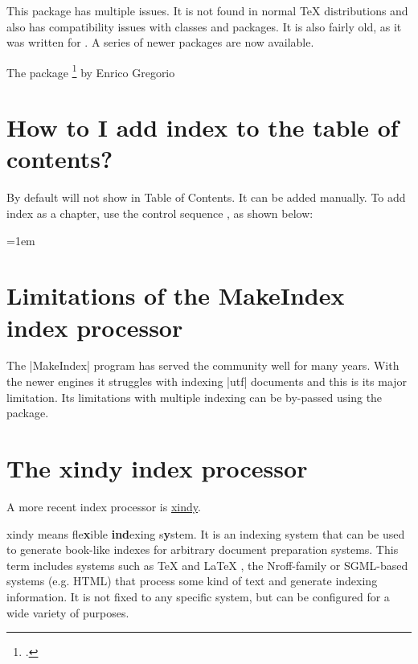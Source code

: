 This package has multiple issues. It is not found in normal TeX distributions and also has compatibility issues with \AmS classes and packages. It is also fairly old, as it was written for . A series of newer packages are now available.

The package \footcite{imakeidx} by Enrico Gregorio 

\section{How to I add index to the table of contents?}
By default \latexe will not show in Table of Contents. It can be added manually. To add index as a chapter, use the control sequence , as shown below:

\begin{teX}
\clearpage
{}
\printindex
\end{teX}

\begin{teX}
\clearpage
{}
\printindex
\end{teX}

\parindent=1em
\section{Limitations of the MakeIndex index processor}

The |MakeIndex| program has served the \latex community well for many years. With the newer engines it struggles
with indexing |utf| documents and this is its major limitation. Its limitations with multiple indexing can be by-passed
using the  package.

\section{The xindy index processor}

A more recent index processor is \href{http://www.xindy.org}{xindy}. 

xindy means fle\textbf{x}ible \textbf{ind}exing s\textbf{y}stem. It is an indexing system that can be used to generate book-like indexes for arbitrary document preparation systems. This term includes systems such as TeX and LaTeX , the Nroff-family or SGML-based systems (e.g. HTML) that process some kind of text and generate indexing information. It is not fixed to any specific system, but can be configured for a wide variety of purposes.

